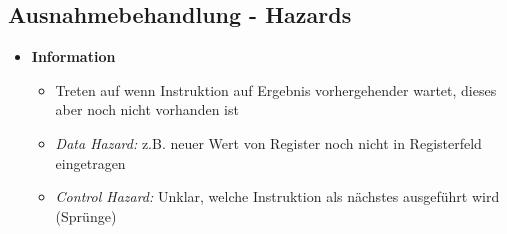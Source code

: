 \subsection{Ausnahmebehandlung - Hazards}
    \begin{itemize}
        \item \textbf{Information}
            \begin{itemize}
                \item Treten auf wenn Instruktion auf Ergebnis vorhergehender wartet, dieses aber noch nicht vorhanden ist
                \item \textit{Data Hazard:} z.B. neuer Wert von Register noch nicht in Registerfeld eingetragen
                \item \textit{Control Hazard:} Unklar, welche Instruktion als nächstes ausgeführt wird (Sprünge) 
            \end{itemize}
        

\end{itemize}
